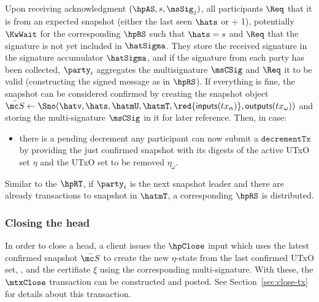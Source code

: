 \quad Upon receiving acknowledgment $(\hpAS,s,\msSig_j)$, all
participants $\Req$ that it is from an expected snapshot (either the last seen
$\hats$ or + 1), potentially $\KwWait$ for the corresponding $\hpRS$ such that
$\hats = s$ and $\Req$ that the signature is not yet included in $\hatSigma$.
They store the received signature in the signature accumulator $\hatSigma$, and
if the signature from each party has been collected, $\party_i$ aggregates the
multisignature $\msCSig$ and $\Req$ it to be valid (constructing the signed message
as in $\hpRS$). If everything is fine, the snapshot can be considered confirmed by creating
the snapshot object $\bar{\mc S} \gets \Sno(\hatv, \hats, \hatmU, \hatmT, \red{\mathsf{inputs}(tx_\alpha)}, \mathsf{outputs}(tx_\omega))$
and storing the multi-signature $\msCSig$ in it for later reference. Then, in case:
\begin{itemize}
\item
	there is a pending decrement any participant can now submit a $\mathtt{decrementTx}$
	by providing the just confirmed snapshot with its digests of the active UTxO set
	$\eta$ and the UTxO set to be removed $\eta_\omega$.

\end{itemize}
Similar to the $\hpRT$, if $\party_i$ is the next snapshot leader and there are
already transactions to snapshot in $\hatmT$, a corresponding $\hpRS$ is distributed.

\subsubsection{Closing the head}

\quad In order to close a head, a client issues the
$\hpClose$ input which uses the latest confirmed snapshot $\bar{\mc S}$ to
create the new $\eta$-state from the last confirmed UTxO set, , and the certifiate
$\xi$ using the corresponding multi-signature. With these, the $\mtxClose$ transaction
can be constructed and posted. See Section~\ref{sec:close-tx} for details about this
transaction. \\


